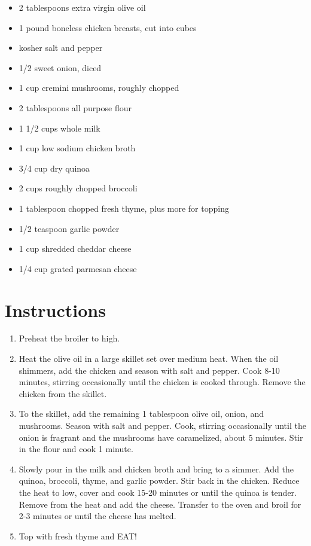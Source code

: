 \documentclass[
  letterpaper,
  DIV=11,
  numbers=noendperiod,
  titlepage=false]{scrreprt}
\providecommand{\tightlist}{%
  \setlength{\itemsep}{0pt}\setlength{\parskip}{0pt}}\usepackage{longtable,booktabs,array}
\begin{document}
\begin{itemize}
\tightlist
\item
  2 tablespoons extra virgin olive oil
\item
  1 pound boneless chicken breasts, cut into cubes
\item
  kosher salt and pepper
\item
  1/2 sweet onion, diced
\item
  1 cup cremini mushrooms, roughly chopped
\item
  2 tablespoons all purpose flour
\item
  1 1/2 cups whole milk
\item
  1 cup low sodium chicken broth
\item
  3/4 cup dry quinoa
\item
  2 cups roughly chopped broccoli
\item
  1 tablespoon chopped fresh thyme, plus more for topping
\item
  1/2 teaspoon garlic powder
\item
  1 cup shredded cheddar cheese
\item
  1/4 cup grated parmesan cheese
\end{itemize}

\section{Instructions}\label{instructions-60}

\begin{enumerate}
\def\labelenumi{\arabic{enumi}.}
\tightlist
\item
  Preheat the broiler to high.
\item
  Heat the olive oil in a large skillet set over medium heat. When the
  oil shimmers, add the chicken and season with salt and pepper. Cook
  8-10 minutes, stirring occasionally until the chicken is cooked
  through. Remove the chicken from the skillet.
\item
  To the skillet, add the remaining 1 tablespoon olive oil, onion, and
  mushrooms. Season with salt and pepper. Cook, stirring occasionally
  until the onion is fragrant and the mushrooms have caramelized, about
  5 minutes. Stir in the flour and cook 1 minute.
\item
  Slowly pour in the milk and chicken broth and bring to a simmer. Add
  the quinoa, broccoli, thyme, and garlic powder. Stir back in the
  chicken. Reduce the heat to low, cover and cook 15-20 minutes or until
  the quinoa is tender. Remove from the heat and add the cheese.
  Transfer to the oven and broil for 2-3 minutes or until the cheese has
  melted.
\item
  Top with fresh thyme and EAT!
\end{enumerate}
\end{document}
